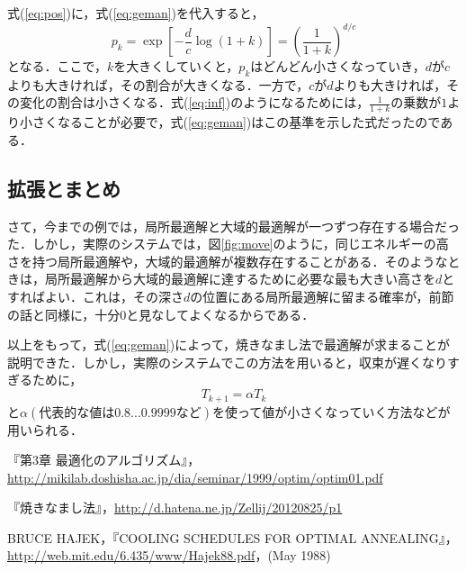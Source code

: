 \documentclass{jarticle}
\begin{document}
式(\ref{eq:pos})に，式(\ref{eq:geman})を代入すると，
\begin{equation}
	p_k = \exp [-\frac{d}{c} \log (1 + k) ] = (\frac{1}{1 + k })^ {d/c}
\end{equation}
となる．ここで，$k$を大きくしていくと，$p_k$はどんどん小さくなっていき，$d$が$c$よりも大きければ，その割合が大きくなる．一方で，$c$が$d$よりも大きければ，その変化の割合は小さくなる．式(\ref{eq:inf})のようになるためには，$\frac{1}{1 + k }$の乗数が$1$より小さくなることが必要で，式(\ref{eq:geman})はこの基準を示した式だったのである．


\subsection{拡張とまとめ}
さて，今までの例では，局所最適解と大域的最適解が一つずつ存在する場合だった．しかし，実際のシステムでは，図\ref{fig:move}のように，同じエネルギーの高さを持つ局所最適解や，大域的最適解が複数存在することがある．そのようなときは，局所最適解から大域的最適解に達するために必要な最も大きい高さを$d$とすればよい．これは，その深さ$d$の位置にある局所最適解に留まる確率が，前節の話と同様に，十分$0$と見なしてよくなるからである．

以上をもって，式(\ref{eq:geman})によって，焼きなまし法で最適解が求まることが説明できた．しかし，実際のシステムでこの方法を用いると，収束が遅くなりすぎるために，
\begin{equation}
	T_{k+1} = \alpha T_{k}
\end{equation}
と$\alpha(\text{代表的な値は}0.8 ... 0.9999 \text{など} )$を使って値が小さくなっていく方法などが用いられる．




\begin{thebibliography}{n}
『第3章 最適化のアルゴリズム』，\url{http://mikilab.doshisha.ac.jp/dia/seminar/1999/optim/optim01.pdf}

『焼きなまし法』，\url{http://d.hatena.ne.jp/Zellij/20120825/p1}

BRUCE HAJEK，『COOLING SCHEDULES FOR OPTIMAL ANNEALING』，\url{http://web.mit.edu/6.435/www/Hajek88.pdf}，(May 1988)

\end{thebibliography}
\end{document}
